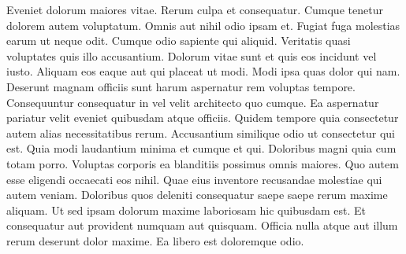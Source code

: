 Eveniet dolorum maiores vitae. Rerum culpa et consequatur. Cumque tenetur
dolorem autem voluptatum. Omnis aut nihil odio ipsam et. Fugiat fuga molestias
earum ut neque odit. Cumque odio sapiente qui aliquid. Veritatis quasi
voluptates quis illo accusantium. Dolorum vitae sunt et quis eos incidunt vel
iusto. Aliquam eos eaque aut qui placeat ut modi. Modi ipsa quas dolor qui nam.
Deserunt magnam officiis sunt harum aspernatur rem voluptas tempore.
Consequuntur consequatur in vel velit architecto quo cumque. Ea aspernatur
pariatur velit eveniet quibusdam atque officiis. Quidem tempore quia
consectetur autem alias necessitatibus rerum. Accusantium similique odio ut
consectetur qui est. Quia modi laudantium minima et cumque et qui. Doloribus
magni quia cum totam porro. Voluptas corporis ea blanditiis possimus omnis
maiores. Quo autem esse eligendi occaecati eos nihil. Quae eius inventore
recusandae molestiae qui autem veniam. Doloribus quos deleniti consequatur
saepe saepe rerum maxime aliquam. Ut sed ipsam dolorum maxime laboriosam hic
quibusdam est. Et consequatur aut provident numquam aut quisquam. Officia nulla
atque aut illum rerum deserunt dolor maxime. Ea libero est doloremque odio.

